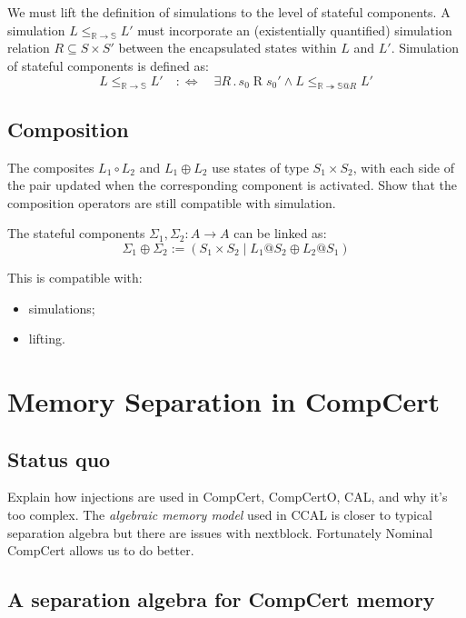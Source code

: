 \documentclass[acmsmall,screen,review,anonymous]{acmart}
\begin{document}
We must lift the definition of simulations
to the level of stateful components.
A simulation $L \le_{\mathbb{R} \rightarrow \mathbb{S}} L'$
must incorporate an (existentially quantified)
simulation relation $R \subseteq S \times S'$
between the encapsulated states within $L$ and $L'$.
Simulation of stateful components is defined as:
\[
  L \le_{\mathbb{R} \rightarrow \mathbb{S}} L' \quad :\Leftrightarrow \quad
  \exists R \mathbin{.}
    s_0 \mathrel{R} s_0' \wedge
    L \le_{\mathbb{R} \twoheadrightarrow \mathbb{S}@R} L'
\]

\subsection{Composition}

The composites $L_1 \circ L_2$ and $L_1 \oplus L_2$
use states of type $S_1 \times S_2$,
with each side of the pair updated when the corresponding component
is activated.
Show that the composition operators are
still compatible with simulation.

\begin{definition}[Linking]
The stateful components $\Sigma_1, \Sigma_2 : A \rightarrow A$
can be linked as:
\[
  \Sigma_1 \oplus \Sigma_2 :=
    ( S_1 \times S_2 \mid L_1@S_2 \oplus L_2@S_1 )
\]
\end{definition}

\begin{lemma}
  This is compatible with:
  \begin{itemize}
    \item simulations;
    \item lifting.
  \end{itemize}
\end{lemma}

\section{Memory Separation in CompCert}

\subsection{Status quo}

Explain how injections are used in CompCert, CompCertO, CAL,
and why it's too complex.
The \emph{algebraic memory model} used in CCAL
is closer to typical separation algebra
but there are issues with nextblock.
Fortunately Nominal CompCert allows us to
do better.

\subsection{A separation algebra for CompCert memory}
\end{document}
